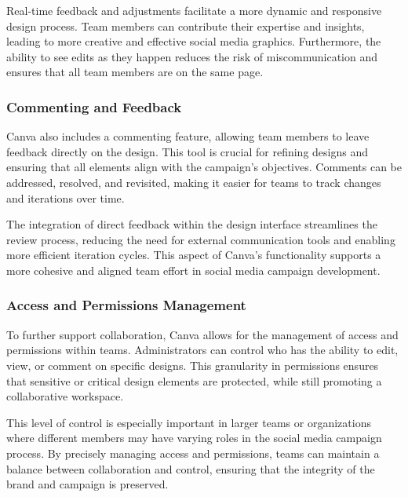 \documentclass[
]{book}
\begin{document}
Real-time feedback and adjustments facilitate a more dynamic and responsive design process. Team members can contribute their expertise and insights, leading to more creative and effective social media graphics. Furthermore, the ability to see edits as they happen reduces the risk of miscommunication and ensures that all team members are on the same page.

\hypertarget{commenting-and-feedback}{%
\subsubsection*{Commenting and Feedback}\label{commenting-and-feedback}}

Canva also includes a commenting feature, allowing team members to leave feedback directly on the design. This tool is crucial for refining designs and ensuring that all elements align with the campaign's objectives. Comments can be addressed, resolved, and revisited, making it easier for teams to track changes and iterations over time.

The integration of direct feedback within the design interface streamlines the review process, reducing the need for external communication tools and enabling more efficient iteration cycles. This aspect of Canva's functionality supports a more cohesive and aligned team effort in social media campaign development.

\hypertarget{access-and-permissions-management}{%
\subsubsection*{Access and Permissions Management}\label{access-and-permissions-management}}

To further support collaboration, Canva allows for the management of access and permissions within teams. Administrators can control who has the ability to edit, view, or comment on specific designs. This granularity in permissions ensures that sensitive or critical design elements are protected, while still promoting a collaborative workspace.

This level of control is especially important in larger teams or organizations where different members may have varying roles in the social media campaign process. By precisely managing access and permissions, teams can maintain a balance between collaboration and control, ensuring that the integrity of the brand and campaign is preserved.
\end{document}
